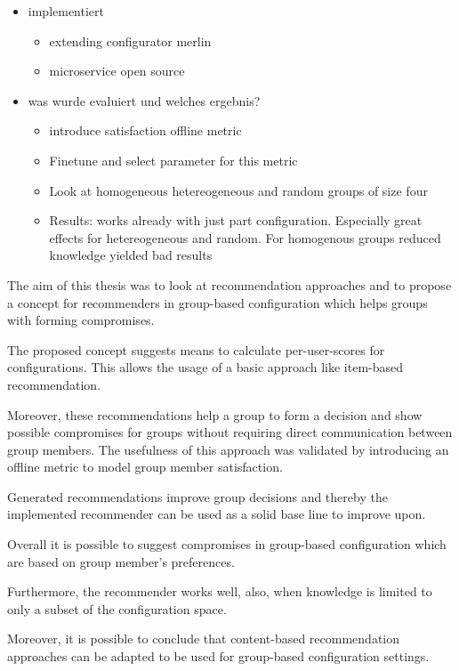\begin{itemize}
\begin{itemize}
        \end{itemize}
    \item implementiert
        \begin{itemize}
            \item extending configurator merlin
            \item microservice open source
        \end{itemize}
    \item was wurde evaluiert und welches ergebnis?
        \begin{itemize}
            \item introduce satisfaction offline metric
            \item Finetune and select parameter for this metric
            \item Look at homogeneous hetereogeneous and random groups of size four
            \item Results: works already with just part configuration. Especially great effects for hetereogeneous and random. For homogenous groups reduced knowledge yielded bad results
        \end{itemize}
\end{itemize}



The aim of this thesis was to look at recommendation approaches and to propose a concept for recommenders in group-based configuration which helps groups with forming compromises. 

The proposed concept suggests means to calculate per-user-scores for configurations. This allows the usage of a basic approach like item-based recommendation. 

Moreover, these recommendations help a group to form a decision and show possible compromises for groups without requiring direct communication between group members. The usefulness of this approach was validated by introducing an offline metric to model group member satisfaction. 

Generated recommendations improve group decisions and thereby the implemented recommender can be used as a solid base line to improve upon. 

Overall it is possible to suggest compromises in group-based configuration which are based on group member's preferences. 

Furthermore, the recommender works well, also, when knowledge is limited to only a subset of the configuration space. 

Moreover, it is possible to conclude that content-based recommendation approaches can be adapted to be used for group-based configuration settings.

